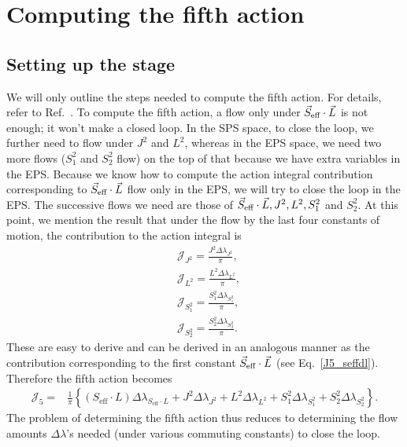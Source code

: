 \section{Computing the fifth action}


\subsection{Setting up the stage}


We will only outline the steps needed to compute the fifth action. For details,
refer to Ref.~\cite{tanay2021action}. To compute the fifth action,
a flow only under $\vec{S}_{\text{eff}}\cdot \vec{L}$ is not enough; it won't make a closed loop.
In the SPS space, to close the loop, we further need to flow under
$J^2$ and $L^2$, whereas in the EPS space, we need two more flows 
($S_1^2$ and $S_2^2$ flow) on the
top of that because we have extra variables in the EPS. Because we know
how to compute the action integral  contribution corresponding
to $\vec{S}_{\text{eff}}\cdot \vec{L}$ flow only in the EPS, we will try to close the loop in the EPS.
The successive flows we need are those of $\vec{S}_{\text{eff}}\cdot \vec{L}, J^2, L^2, S_1^2$ and $S_2^2$.
At this point, we mention the result that under the flow by 
the last four 
constants of motion, the contribution to the action integral is 
\begin{equation}
\begin{aligned}
&\mathcal{J}_{J^{2}}=\frac{J^{2} \Delta \lambda_{J^{2}}}{\pi} , \\
&\mathcal{J}_{L^{2}}=\frac{L^{2} \Delta \lambda_{L^{2}}}{\pi}, \\
&\mathcal{J}_{S_{1}^{2}}=\frac{S_{1}^{2} \Delta \lambda_{S_{1}^{2}}}{\pi}, \\
&\mathcal{J}_{S_{2}^{2}}=\frac{S_{2}^{2} \Delta \lambda_{S_{2}^{2}}}{\pi}.
\end{aligned}
\end{equation}
These are easy to derive and can be derived in an
analogous manner as the contribution corresponding to the first
constant $\vec{S}_{\text{eff}}\cdot \vec{L}$  (see Eq.~\eqref{J5_seffdl}). Therefore the 
fifth action becomes
\begin{equation}     \label{J5_final}
\begin{aligned}
\mathcal{J}_{5}=& \frac{1}{\pi}\left\{\left(S_{\mathrm{eff}} \cdot L\right) \Delta \lambda_{S_{\mathrm{eff}} \cdot L}+J^{2} \Delta \lambda_{J^{2}}+L^{2} \Delta \lambda_{L^{2}}
+S_{1}^{2} \Delta \lambda_{S_{1}^{2}}+S_{2}^{2} \Delta \lambda_{S_{2}^{2}}\right\} .
\end{aligned}
\end{equation}
The problem of determining the fifth action thus reduces to determining 
the flow amounts $\Delta \lambda$'s needed (under various commuting constants) to close the loop.



